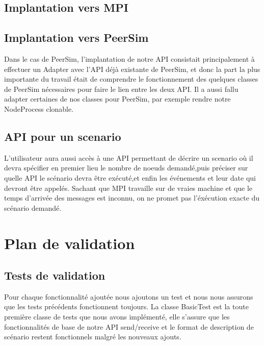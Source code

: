 \documentclass{article}
\begin{document}
			\subsection{Implantation vers MPI}
			
			\subsection{Implantation vers PeerSim}
			Dans le cas de PeerSim, l'implantation de notre API consistait principalement à effectuer un Adapter avec l'API déjà existante de PeerSim, et donc la part la plus importante du travail était de comprendre le fonctionnement des quelques classes de PeerSim nécessaires pour faire le lien entre les deux API. Il a aussi fallu adapter certaines de nos classes pour PeerSim, par exemple rendre notre NodeProcess clonable. 
			\subsection{API pour un scenario}
			L'utilisateur aura aussi accès à une API permettant de décrire un scenario où il devra spécifier en premier lieu
			le nombre de noeuds demandé,puis préciser sur quelle API le scénario devra être exécuté,et enfin les événements et leur date qui devront être appelés.
			Sachant que MPI travaille sur de vraies machine et que le temps d'arrivée des messages est inconnu, on ne promet pas l'éxécution exacte du scénario demandé. 

		\section{Plan de validation}
		\subsection{Tests de validation}
		Pour chaque fonctionnalité ajoutée nous ajoutons un test et nous nous assurons que les tests précédents fonctionnent toujours.
		\newline
		La classe BasicTest est la toute première classe de tests que nous avons implémenté, elle s'assure que les fonctionnalités de base de notre API
		send/receive et le format de description de scénario restent fonctionnels malgré les nouveaux ajouts.
\end{document}

